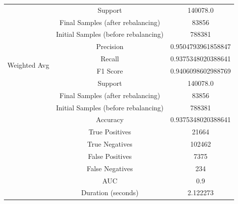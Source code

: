 \begin{longtable}{|c|c|c|}
 & Support & 140078.0 \\
 & Final Samples (after rebalancing) & 83856 \\
 & Initial Samples (before rebalancing) & 788381 \\
\hline
\multirow{4}{*}{Weighted Avg} & Precision & 0.9504793961858847 \\
 & Recall & 0.9375348020388641 \\
 & F1 Score & 0.9406098602988769 \\
 & Support & 140078.0 \\
 & Final Samples (after rebalancing) & 83856 \\
 & Initial Samples (before rebalancing) & 788381 \\
\hline
& Accuracy & 0.9375348020388641 \\ \hline
& True Positives & 21664 \\ \hline
& True Negatives & 102462 \\ \hline
& False Positives & 7375 \\ \hline
& False Negatives & 234 \\ \hline
& AUC & 0.9 \\ \hline
& Duration (seconds) & 2.122273 \\ \hline
\end{longtable}


